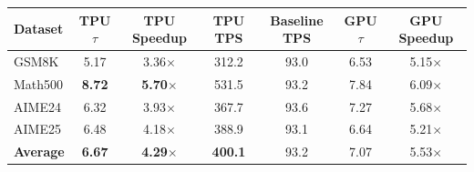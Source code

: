\centering
\begin{tabular}{l|cccc|cc}
\toprule
Dataset & TPU $\tau$ & TPU Speedup & TPU TPS & Baseline TPS & GPU $\tau$ & GPU Speedup \\
\midrule
GSM8K   & 5.17 & 3.36$\times$ & 312.2 & 93.0 & 6.53 & 5.15$\times$ \\
Math500 & \textbf{8.72} & \textbf{5.70}$\times$ & 531.5 & 93.2 & 7.84 & 6.09$\times$ \\
AIME24  & 6.32 & 3.93$\times$ & 367.7 & 93.6 & 7.27 & 5.68$\times$ \\
AIME25  & 6.48 & 4.18$\times$ & 388.9 & 93.1 & 6.64 & 5.21$\times$ \\
\midrule
\textbf{Average} & \textbf{6.67} & \textbf{4.29}$\times$ & \textbf{400.1} & 93.2 & 7.07 & 5.53$\times$ \\
\bottomrule
\end{tabular}
